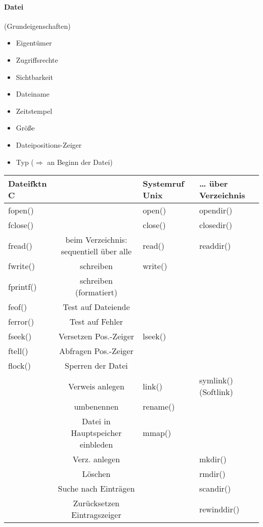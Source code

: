 \paragraph{Datei} (Grundeigenschaften)
\begin{itemize}
\item Eigentümer
\item Zugriffsrechte
\item Sichtbarkeit
\item Dateiname
\item Zeitstempel
\item Größe
\item Dateipositions-Zeiger
\item Typ ($\Rightarrow$  an Beginn der Datei)
\end{itemize}
\begin{tabular}{l | c | l | l}
\label{tab:syscalls}
Dateifktn C & & Systemruf Unix & … über Verzeichnis\\
\hline 
fopen() & & open() & opendir()\\
fclose() & & close() & closedir()\\
fread() & beim Verzeichnis: sequentiell über alle & read() & readdir()\\
fwrite() & schreiben & write()\\
fprintf() & schreiben (formatiert) & \\
feof() & Test auf Dateiende &\\
ferror() & Test auf Fehler &\\
fseek() & Versetzen Pos.-Zeiger & lseek()\\
ftell() & Abfragen Pos.-Zeiger &\\
flock() & Sperren der Datei &\\
& Verweis anlegen & link() & symlink() (Softlink)\\
& umbenennen & rename()\\
& Datei in Hauptspeicher einbleden & mmap()\\
& Verz. anlegen && mkdir()\\
& Löschen&& rmdir()\\
& Suche nach Einträgen&& scandir()\\
& Zurücksetzen Eintragszeiger & & rewinddir()
\end{tabular}
